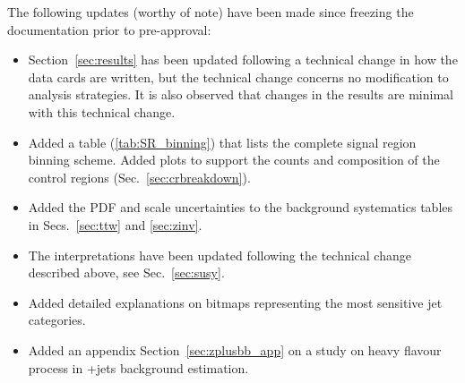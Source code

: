 The following updates (worthy of note) have been made since freezing
the documentation prior to pre-approval:
\begin{itemize}
\item Section~\ref{sec:results} has been updated following a technical change 
  in how the data cards are written, but the technical change concerns 
  no modification to analysis strategies. It is also observed that 
  changes in the results are minimal with this technical change.
\item Added a table (\ref{tab:SR_binning}) that lists the complete
  signal region binning scheme. Added plots to support the counts and
  composition of the control regions (Sec.~\ref{sec:crbreakdown}).
\item Added the PDF and scale uncertainties to the background
  systematics tables in Secs.~\ref{sec:ttw} and \ref{sec:zinv}.
\item The interpretations have been updated following the technical
  change described above, see Sec.~\ref{sec:susy}.
\item Added detailed explanations on bitmaps representing the most sensitive 
  jet categories.
\item Added an appendix Section~\ref{sec:zplusbb_app} on a study on heavy 
  flavour process in \znunu+jets background estimation.
\end{itemize}

